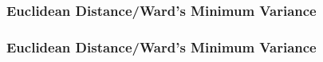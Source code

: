 \documentclass[10pt]{beamer}
\begin{document}
\begin{frame}[fragile]
\frametitle{Euclidean Distance/Ward's Minimum Variance}
\label{iriscluster2}
\begin{center}
\end{center}

\end{frame}

\begin{frame}[fragile]
\frametitle{Euclidean Distance/Ward's Minimum Variance}
\begin{center}
\end{center}

\end{frame}
\end{document}

